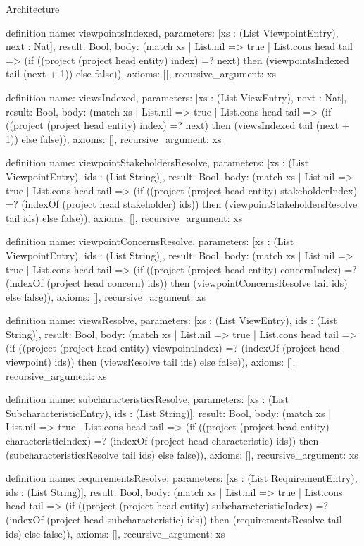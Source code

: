 \begin{lexlean}{Architecture}
\begin{semanticmodule}
definition{
  name: viewpointsIndexed,
  parameters: [xs : (List ViewpointEntry), next : Nat],
  result: Bool,
  body: (match xs
    | List.nil => true
    | List.cons head tail => (if ((project (project head entity) index) =? next) then (viewpointsIndexed tail (next + 1)) else false)),
  axioms: [],
  recursive_argument: xs
}

definition{
  name: viewsIndexed,
  parameters: [xs : (List ViewEntry), next : Nat],
  result: Bool,
  body: (match xs
    | List.nil => true
    | List.cons head tail => (if ((project (project head entity) index) =? next) then (viewsIndexed tail (next + 1)) else false)),
  axioms: [],
  recursive_argument: xs
}

definition{
  name: viewpointStakeholdersResolve,
  parameters: [xs : (List ViewpointEntry), ids : (List String)],
  result: Bool,
  body: (match xs
    | List.nil => true
    | List.cons head tail => (if ((project (project head entity) stakeholderIndex) =? (indexOf (project head stakeholder) ids)) then (viewpointStakeholdersResolve tail ids) else false)),
  axioms: [],
  recursive_argument: xs
}

definition{
  name: viewpointConcernsResolve,
  parameters: [xs : (List ViewpointEntry), ids : (List String)],
  result: Bool,
  body: (match xs
    | List.nil => true
    | List.cons head tail => (if ((project (project head entity) concernIndex) =? (indexOf (project head concern) ids)) then (viewpointConcernsResolve tail ids) else false)),
  axioms: [],
  recursive_argument: xs
}

definition{
  name: viewsResolve,
  parameters: [xs : (List ViewEntry), ids : (List String)],
  result: Bool,
  body: (match xs
    | List.nil => true
    | List.cons head tail => (if ((project (project head entity) viewpointIndex) =? (indexOf (project head viewpoint) ids)) then (viewsResolve tail ids) else false)),
  axioms: [],
  recursive_argument: xs
}

definition{
  name: subcharacteristicsResolve,
  parameters: [xs : (List SubcharacteristicEntry), ids : (List String)],
  result: Bool,
  body: (match xs
    | List.nil => true
    | List.cons head tail => (if ((project (project head entity) characteristicIndex) =? (indexOf (project head characteristic) ids)) then (subcharacteristicsResolve tail ids) else false)),
  axioms: [],
  recursive_argument: xs
}

definition{
  name: requirementsResolve,
  parameters: [xs : (List RequirementEntry), ids : (List String)],
  result: Bool,
  body: (match xs
    | List.nil => true
    | List.cons head tail => (if ((project (project head entity) subcharacteristicIndex) =? (indexOf (project head subcharacteristic) ids)) then (requirementsResolve tail ids) else false)),
  axioms: [],
  recursive_argument: xs
}


\end{semanticmodule}
\end{lexlean}
